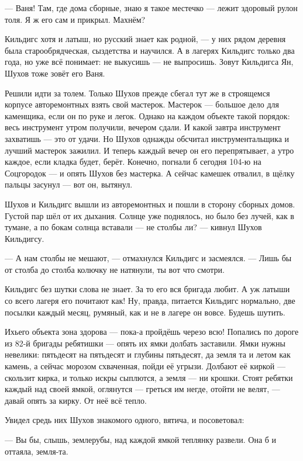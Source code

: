 --- Ваня! Там, где дома сборные, знаю я такое местечко --- лежит здоровый рулон толя. Я ж его сам и 
прикрыл. Махнём?

Кильдигс хотя и латыш, но русский знает как родной, --- у них рядом деревня была 
старообрядческая, сыздетства и научился. А в лагерях Кильдигс только два года, но уже всё 
понимает: не выкусишь --- не выпросишь. Зовут Кильдигса Ян, Шухов тоже зовёт его Ваня.

Решили идти за толем. Только Шухов прежде сбегал тут же в строящемся корпусе авторемонтных 
взять свой мастерок. Мастерок --- большое дело для каменщика, если он по руке и легок. Однако 
на каждом объекте такой порядок: весь инструмент утром получили, вечером сдали. И какой 
завтра инструмент захватишь --- это от удачи. Но Шухов однажды обсчитал инструментальщика и 
лучший мастерок зажилил. И теперь каждый вечер он его перепрятывает, а утро каждое, если 
кладка будет, берёт. Конечно, погнали б сегодня 104-ю на Соцгородок --- и опять Шухов без 
мастерка. А сейчас камешек отвалил, в щёлку пальцы засунул --- вот он, вытянул.

Шухов и Кильдигс вышли из авторемонтных и пошли в сторону сборных домов. Густой пар шёл от их 
дыхания. Солнце уже поднялось, но было без лучей, как в тумане, а по бокам солнца вставали --- 
не столбы ли? --- кивнул Шухов Кильдигсу.

--- А нам столбы не мешают, --- отмахнулся Кильдигс и засмеялся. --- Лишь бы от столба до столба 
колючку не натянули, ты вот что смотри.

Кильдигс без шутки слова не знает. За то его вся бригада любит. А уж латыши со всего лагеря 
его почитают как! Ну, правда, питается Кильдигс нормально, две посылки каждый месяц, румяный, 
как и не в лагере он вовсе. Будешь шутить.

Ихьего объекта зона здорова --- пока-а пройдёшь черезо всю! Попались по дороге из 82-й бригады 
ребятишки --- опять их ямки долбать заставили. Ямки нужны невелики: пятьдесят на пятьдесят и 
глубины пятьдесят, да земля та и летом как камень, а сейчас морозом схваченная, пойди её 
угрызи. Долбают её киркой --- скользит кирка, и только искры сыплются, а земля --- ни крошки. 
Стоят ребятки каждый над своей ямкой, оглянутся --- греться им негде, отойти не велят, --- давай 
опять за кирку. От неё всё тепло.

Увидел средь них Шухов знакомого одного, вятича, и посоветовал:

--- Вы бы, слышь, землерубы, над каждой ямкой теплянку развели. Она б и оттаяла, земля-та.

